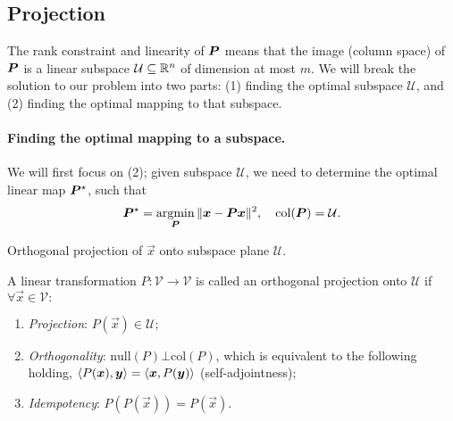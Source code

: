 \subsection{Projection}

The rank constraint and linearity of $\bm{P}$ means that the image (column space) of $\bm{P}$ is
a linear subspace $\mathcal{U} \subseteq \mathbb{R}^n$ of dimension at most $m$. We will break the solution
to our problem into two parts: (1) finding the optimal subspace $\mathcal{U}$, and (2) finding the
optimal mapping to that subspace.

\paragraph{Finding the optimal mapping to a subspace.}

We will first focus on (2); given subspace $\mathcal{U}$, we need to determine the optimal linear
map $\bm{P}^\star$, such that \[
    \bm{P}^\star = \operatorname*{argmin}_{\bm{P}} \| \bm{x} - \bm{P}\bm{x} \|^2, \quad \mathrm{col}(\bm{P}) = \mathcal{U}.
\]

\begin{marginfigure}[3cm]
    \centering
    \caption{Orthogonal projection of $\vec{x}$ onto subspace plane $\mathcal{U}$.}
    \label{fig:orthogonal-projection}
\end{marginfigure}

\begin{definition}
    \label{def:orthogonal-projection}

    A linear transformation $P: \mathcal{V} \to \mathcal{V}$ is called an orthogonal projection onto
    $\mathcal{U}$ if $\forall \vec{x}\in \mathcal{V}:$
    \begin{enumerate}
        \item \textit{Projection}: $P(\vec{x}) \in \mathcal{U}$;
        \item \textit{Orthogonality}: $\mathrm{null}(P) \bot \mathrm{col}(P)$, which is equivalent to
              the following holding, $\langle P(\bm{x}), \bm{y} \rangle = \langle \bm{x},P(\bm{y}) \rangle$ (self-adjointness);
        \item \textit{Idempotency}: $P(P(\vec{x})) = P(\vec{x})$.
    \end{enumerate}
\end{definition}

